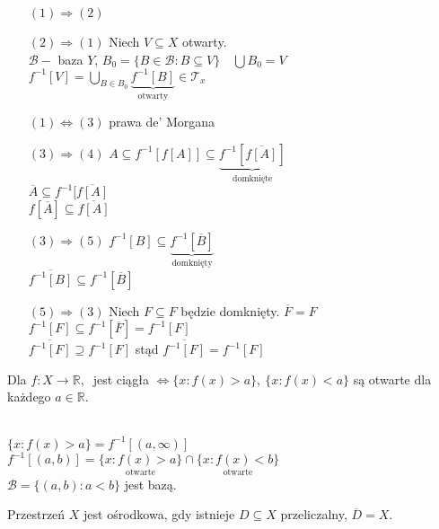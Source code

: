 \begin{dd} \hfill
    \begin{itemize} 
        \item[$(1) \Rightarrow (2)$] 
        \item[$(2) \Rightarrow (1)$] Niech $V \subseteq X$ otwarty. \\ 
            $\mathcal B -$ baza $Y$, $B_0 = \{ B \in \mathcal B : B \subseteq V \} \quad \bigcup B_0 = V$ \\ 
            $f^{-1} [V] = \bigcup\limits_{B \in B_0} \underbrace{f^{-1} [B]}_{\text{otwarty}} \in \mathcal T_x$
        \item[$(1) \Leftrightarrow (3)$] prawa de' Morgana
        \item[$(3) \Rightarrow (4)$] $A \subseteq f^{-1} [f[A]] \subseteq \underbrace{f^{-1}[\overline{f[A]}]}_{\text{domknięte}}$ \\
            $\overline A \subseteq f^{-1}[ \overline{f[A]}$ \\ 
            $f[\overline A] \subseteq \overline{ f[A]}$
        \item[$(3) \Rightarrow (5)$] $f^{-1}[B] \subseteq \underbrace{f^{-1}[\overline B]}_{\text{domknięty}}$ \\ 
            $\overline{ f^{-1}[B]} \subseteq f^{-1}[\overline B]$
        \item[$(5) \Rightarrow (3)$] Niech $F \subseteq F$ będzie domknięty. $\overline F = F$ \\ 
            $f^{-1}[F] \subseteq f^{-1}[\overline F] = f^{-1}[F]$ \\ 
            $\overline{f^{-1}[F]} \supseteq f^{-1}[F]$ stąd $\overline{f^{-1}[F]} = f^{-1}[F]$
    \end{itemize} 
\end{dd} 
\begin{wn} 
    Dla $f: X \to \mathbb R,\ $ jest ciągła $\Leftrightarrow \{x: f(x) > a\},\ \{x: f(x) < a\}$ są 
    otwarte dla każdego $a \in \mathbb R$.
\end{wn} 
\begin{dd} ~\\ 
    $\{x : f(x) > a\} = f^{-1}[(a,\infty)]$\\
    $f^{-1}[(a,b)] = \underset{\text{otwarte}}{\{x : f(x) > a\}} \cap \underset{\text{otwarte}}{\{x : f(x) < b\}}$ \\ 
    $\mathcal B = \{(a,b): a < b\}$ jest bazą.
\end{dd} 
\begin{przyp} Przestrzeń $X$ jest ośrodkowa, gdy istnieje $D \subseteq X$ przeliczalny, $\overline D = X$. 
    \end{przyp} 
